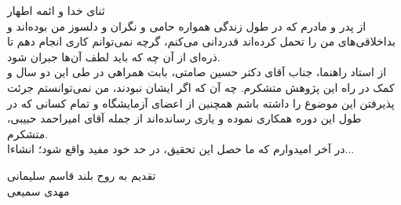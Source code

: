 \thispagestyle{empty}

{\nastaliq
ثنای خدا و ائمه اطهار
\\
از پدر و مادرم که در طول زندگی همواره حامی و نگران و دلسوز من‌ بوده‌اند و بداخلاقی‌های من را تحمل کرده‌اند قدردانی می‌کنم، گرچه نمی‌توانم کاری انجام دهم تا ذره‌ای از آن چه که باید لطف آن‌ها جبران شود.
\\
از استاد راهنما، جناب آقای دکتر حسین صامتی،‌ بابت همراهی در طی این دو سال و کمک در راه این پژوهش متشکرم. چه آن که اگر ایشان نبودند، من نمی‌توانستم جرئت پذیرفتن این موضوع را داشته باشم
همچنین از اعضای آزمایشگاه و تمام کسانی که در طول این دوره همکاری نموده و یاری رسانده‌اند از جمله آقای امیراحمد حبیبی، متشکرم.
\\
در آخر امیدوارم که ما حصل این تحقیق، در حد خود مفید واقع شود؛ انشاءا...

تقدیم به روح بلند قاسم سلیمانی
\\


\vspace{1cm}
مهدی سمیعی
}
\newpage\clearpage